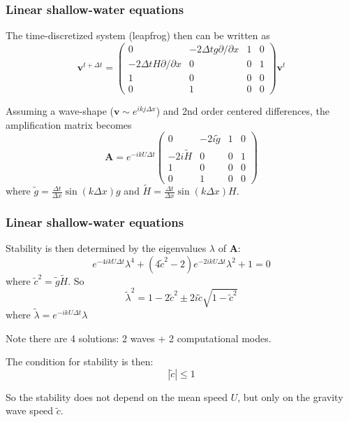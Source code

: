 \documentclass[aspectratio=43,9pt]{beamer}
\begin{document}
%
%
\begin{frame}
	\frametitle{Linear shallow-water equations}
	\begin{myitemize}{2ex}
		\item The time-discretized system (leapfrog) then can be written as
			\begin{equation*}
				\bm v^{t+\Delta t} = \left(\begin{array}{cccc}
						0 & -2\Delta t g\partial/\partial x & 1 & 0 \\
						-2 \Delta t H\partial/\partial x & 0 & 0 & 1 \\
						1 & 0 & 0 & 0 \\
						0 & 1 & 0 & 0
					\end{array}\right)\bm v^t
			\end{equation*}
			
		\item Assuming a wave-shape ($\bm v\sim e^{ikj\Delta x}$) and 2nd order centered differences, the amplification matrix becomes
			\begin{equation*}
				\bm A=e^{-ikU\Delta t}\left(\begin{array}{cccc}
						0 & -2i\tilde g & 1 & 0 \\
						-2 i \tilde H & 0 & 0 & 1 \\
						1 & 0 & 0 & 0 \\
						0 & 1 & 0 & 0
					\end{array}\right)
			\end{equation*}
			where $\tilde g=\frac{\Delta t}{\Delta x}\sin(k\Delta x)g$ and $\tilde H=\frac{\Delta t}{\Delta x}\sin(k\Delta x)H$.
	\end{myitemize}
\end{frame}
%
%
\begin{frame}
	\frametitle{Linear shallow-water equations}
	\begin{myitemize}{2ex}
		\item Stability is then determined by the eigenvalues $\lambda$ of $\bm A$:
			\begin{equation*}
				e^{-4ikU\Delta t}\lambda^4 + \left( 4 \tilde c^2 - 2 \right) e^{-2ikU\Delta t}\lambda^2 +1 =0
			\end{equation*}
			where $\tilde c^2 = \tilde g \tilde H$. So
			\begin{equation*}
				\tilde \lambda^2 = 1 - 2 \tilde c^2 \pm 2 i \tilde c \sqrt{ 1 - \tilde c^2}
			\end{equation*}
			where $\tilde \lambda=e^{-ikU\Delta t}\lambda$
		\item Note there are 4 solutions: 2 waves + 2 computational modes.
		\item The condition for stability is then:
			\begin{equation*}
				| \tilde c | \le 1
			\end{equation*}
		\item So the stability does not depend on the mean speed $U$, but only on the gravity wave speed $\tilde c$.
	\end{myitemize}
\end{frame}
\end{document}
